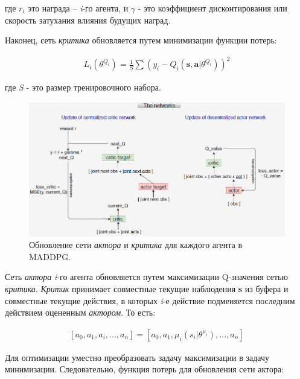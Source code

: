 где $r_i$ это награда – \textit{i}-го агента, и $\gamma$ - это коэффициент дисконтирования или скорость затухания влияния будущих наград.

Наконец, сеть \textit{критика} обновляется путем минимизации функции потерь:

\begin{equation}
    \begin{multlined}
        L_i(\theta^{Q_i}) = \frac{1}{S} \sum (y_i - Q_i(\mathbf{s, a}|\theta^{Q_i}))^2
    \end{multlined}
\end{equation}

где \textit{S} - это размер тренировочного набора.

\begin{figure}[ht!] %
    \center
    \includegraphics [scale=0.80] {my_folder/images/ch3/network-training.png}
    \caption{Обновление сети \textit{актора} и \textit{критика} для каждого агента в MADDPG.}
    \label{fig:ch3-network-training}
\end{figure}

Сеть \textit{актора} \textit{i}-го агента обновляется путем максимизации Q-значения сетью \textit{критика}. \textit{Критик} принимает совместные текущие наблюдения \textbf{s} из буфера и совместные текущие действия, в которых \textit{i}-е действие подменяется последним действием оцененным \textit{актором}. То есть:

\begin{equation}
    \begin{multlined}
    [a_0, a_1, a_i, ..., a_n]
        = [a_0, a_1, \mu_i(s_i|\theta^{\mu_i}), ..., a_n]
    \end{multlined}
\end{equation}

Для оптимизации уместно преобразовать задачу максимизации в задачу минимизации. Следовательно, функция потерь для обновления сети актора:

